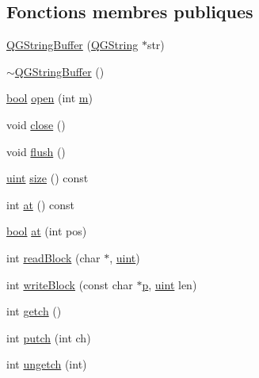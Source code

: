 \subsection*{Fonctions membres publiques}
\begin{DoxyCompactItemize}
\item 
\hyperlink{class_q_g_string_buffer_a36c11661db62c68c4a48db5f9cdfd69c}{Q\+G\+String\+Buffer} (\hyperlink{class_q_g_string}{Q\+G\+String} $\ast$str)
\item 
\hyperlink{class_q_g_string_buffer_a2b65103562e14af15beb161d21440742}{$\sim$\+Q\+G\+String\+Buffer} ()
\item 
\hyperlink{qglobal_8h_a1062901a7428fdd9c7f180f5e01ea056}{bool} \hyperlink{class_q_g_string_buffer_afcecb219691daf1fb5f18f7324fc52b7}{open} (int \hyperlink{060__command__switch_8tcl_a78d127e8bda64d4471ac811ad512fbd9}{m})
\item 
void \hyperlink{class_q_g_string_buffer_a02458102f8968ef46bfaeab319f8e2fc}{close} ()
\item 
void \hyperlink{class_q_g_string_buffer_a655d2990426c9a646fc4d14273fb89c0}{flush} ()
\item 
\hyperlink{qglobal_8h_a4d3943ddea65db7163a58e6c7e8df95a}{uint} \hyperlink{class_q_g_string_buffer_a70f88b22a59005d0afd461bfa33c5e2c}{size} () const 
\item 
int \hyperlink{class_q_g_string_buffer_a27bd3365075756c5d4ac60dd43a1e1d4}{at} () const 
\item 
\hyperlink{qglobal_8h_a1062901a7428fdd9c7f180f5e01ea056}{bool} \hyperlink{class_q_g_string_buffer_ab1bcf1133571fd71797ad11d5d7f3cb4}{at} (int pos)
\item 
int \hyperlink{class_q_g_string_buffer_aa5ab1052c6a1a9365418f55c55022fb2}{read\+Block} (char $\ast$, \hyperlink{qglobal_8h_a4d3943ddea65db7163a58e6c7e8df95a}{uint})
\item 
int \hyperlink{class_q_g_string_buffer_aab6c9a7bfbc048b4adff01f4bf920efa}{write\+Block} (const char $\ast$\hyperlink{060__command__switch_8tcl_a15229b450f26d8fa1c10bea4f3279f4d}{p}, \hyperlink{qglobal_8h_a4d3943ddea65db7163a58e6c7e8df95a}{uint} len)
\item 
int \hyperlink{class_q_g_string_buffer_a20699e4c4ba6d7d68c4422d795412751}{getch} ()
\item 
int \hyperlink{class_q_g_string_buffer_ae2265be83385ba58ff0e47880563bbb5}{putch} (int ch)
\item 
int \hyperlink{class_q_g_string_buffer_a6e97e3b078054bdeb5ee62d6970e7863}{ungetch} (int)
\end{DoxyCompactItemize}
